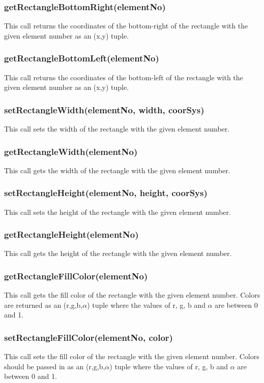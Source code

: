 \documentclass{acm_proc_article-sp}
\begin{document}
\subsubsection{getRectangleBottomRight(elementNo)}
This call returns the coordinates of the bottom-right of the rectangle with the given element number as an (x,y) tuple.
\subsubsection{getRectangleBottomLeft(elementNo)}
This call returns the coordinates of the bottom-left of the rectangle with the given element number as an (x,y) tuple.
\subsubsection{setRectangleWidth(elementNo, width, coorSys)}
This call sets the width of the rectangle with the given element number.
\subsubsection{getRectangleWidth(elementNo)}
This call gets the width of the rectangle with the given element number.
\subsubsection{setRectangleHeight(elementNo, height, coorSys)}
This call sets the height of the rectangle with the given element number.
\subsubsection{getRectangleHeight(elementNo)}
This call gets the height of the rectangle with the given element number.
\subsubsection{getRectangleFillColor(elementNo)}
This call gets the fill color of the rectangle with the given element number. Colors are returned as an (r,g,b,$\alpha$) tuple where the values of r, g, b and $\alpha$ are between 0 and 1.
\subsubsection{setRectangleFillColor(elementNo, color)}
This call sets the fill color of the rectangle with the given element number. Colors should be passed in as an (r,g,b,$\alpha$) tuple where the values of r, g, b and $\alpha$ are between 0 and 1.
\end{document}
